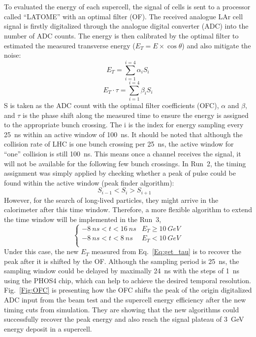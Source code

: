\noindent
\\
\\To evaluated the energy of each supercell, the signal of cells is sent to a processor called ``LATOME'' with an optimal filter (OF). The received analogue LAr cell signal is firstly digitalized through the analogue digital converter (ADC) into the number of ADC counts. The energy is then calibrated by the optimal filter to estimated the measured transverse energy ($E_{T}=E\times\cos\theta$) and also mitigate the noise:
\begin{equation}
\label{Eq:get_Et}
E_{T}=\displaystyle\sum_{i=1}^{i=4}\alpha_{i}S_{i}
\end{equation}
\begin{equation}
\label{Eq:get_tau}
E_{T}\cdot\tau=\displaystyle\sum_{i=1}^{i=4}\beta_{i}S_{i}
\end{equation}
\noindent
S is taken as the ADC count with the optimal filter coefficients (OFC), $\alpha$ and $\beta$, and $\tau$ is the phase shift along the measured time to ensure the energy is assigned to the appropriate bunch crossing. The i is the index for energy sampling every 25~ns within an active window of 100~ns. It should be noted that although the collision rate of LHC is one bunch crossing per 25~ns, the active window for ``one'' collision is still 100~ns. This means once a channel receives the signal, it will not be available for the following few bunch crossings. In Run~2, the timing assignment was simply applied by checking whether a peak of pulse could be found within the active window\cite{Jongmanns:2661780} (peak finder algorithm):
\begin{equation}
S_{i-1}<S_{i}>S_{i+1}\quad 
\end{equation}
However, for the search of long-lived particles, they might arrive in the calorimeter after this time window. Therefore, a more flexible algorithm to extend the time window will be implemented in the Run~3,
\begin{equation}
\begin{cases}
-8~ns<t<16~ns & E_{T}\geq 10~GeV \\
-8~ns<t<8~ns & E_{T}<10~GeV \\
\end{cases}
\end{equation}
Under this case, the new $E_{T}$ measured from Eq.~\ref{Eq:get_tau} is to recover the peak after it is shifted by the OF. Although the sampling period is 25~ns, the sampling window could be delayed by maximally 24~ns with the steps of 1~ns using the PHOS4 chip\cite{Toifl:1999qv}, which can help to achieve the desired temporal resolution. Fig.~\ref{Fig:OFC} is presenting how the OFC shifts the peak of the origin digitalized ADC input from the beam test and the supercell energy efficiency after the new timing cuts from simulation. They are showing that the new algorithms could successfully recover the peak energy and also reach the signal plateau of 3~GeV energy deposit in a supercell.
